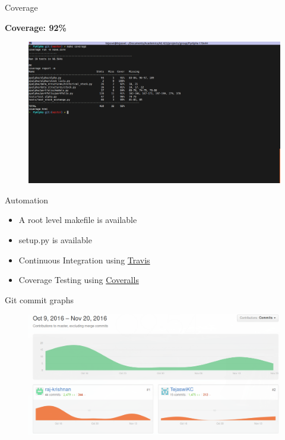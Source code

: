 \documentclass[serif,mathserif]{beamer}
\begin{document}
    \begin{frame}{Coverage}

        \textbf{Coverage: 92\%}
        \begin{figure}
            \centering
            \includegraphics[width = \linewidth]{coverage.png}
        \end{figure}

    \end{frame}

    \begin{frame}{Automation}

        \begin{itemize}
            \item A root level makefile is available
            \item setup.py is available
            \item Continuous Integration using \href{https://travis-ci.org/raj-krishnan/PyAlpha}{Travis}
            \item Coverage Testing using \href{https://coveralls.io/github/raj-krishnan/PyAlpha}{Coveralls}
        \end{itemize}

    \end{frame}

    \begin{frame}{Git commit graphs}

        \begin{figure}[h]
            \centering
            \includegraphics[width=\linewidth]{commits.png}
        \end{figure}

    \end{frame}
\end{document}
